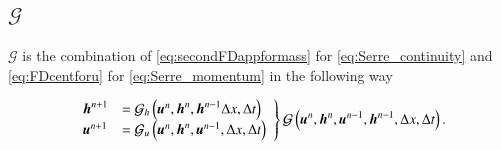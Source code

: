 \documentclass[times]{elsarticle}
\begin{document}
\subsection{$\mathcal{G}$}
$\mathcal{G}$ is the combination of \eqref{eq:secondFDappformass} for \eqref{eq:Serre_continuity} and \eqref{eq:FDcentforu} for \eqref{eq:Serre_momentum} in the following way
\begin{linenomath*}
	\begin{gather}
	\left.
	\begin{array}{l l}
	\boldsymbol{h}^{n+1}&=\mathcal{G}_h\left(\boldsymbol{u}^n,\boldsymbol{h}^n,\boldsymbol{h}^{n-1} \Delta x, \Delta t \right) \\
	\boldsymbol{u}^{n+1}&=\mathcal{G}_u\left(\boldsymbol{u}^n,\boldsymbol{h}^n, \boldsymbol{u}^{n-1}, \Delta x, \Delta t \right)
	\end{array} \right\rbrace \mathcal{G}\left(\boldsymbol{u}^n,\boldsymbol{h}^n, \boldsymbol{u}^{n-1},\boldsymbol{h}^{n-1}, \Delta x, \Delta t \right).
	\label{eq:Gnumdef}
	\end{gather}
\end{linenomath*}
\end{document}

